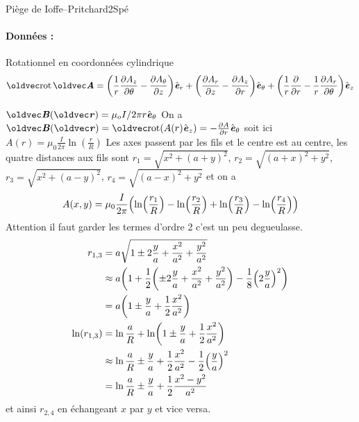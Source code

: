\begin{exercise}{Piège de Ioffe--Pritchard}{2}{Spé}
\paragraph{Données :} 
Rotationnel en coordonnées cylindrique
$$\rot\vA = \qty(\dfrac{1}{r}\pdv{A_z}{\theta} - \pdv{A_\theta}{z}) \ve_r
+ \qty(\pdv{A_r}{z} - \pdv{A_z}{r}) \ve_\theta
+ \qty(\dfrac{1}{r}\pdv{}{r} (r A_\theta) - \dfrac{1}{r}\pdv{A_r}{\theta}) \ve_z$$ 

\end{exercise}

\begin{solution}

\begin{questions}
    \questioncours $\vB(\vr) = \mu_o I/2\pi r \ve_\theta$
    \question On a $\vB(\vr) = \rot(A(r)\ve_z) = -\pdv{A}{r}\ve_\theta$ soit ici $A(r) = \mu_0 \frac{I}{2\pi}\ln(\frac{r}{R})$
    \question Les axes passent par les fils et le centre est au centre, les quatre distances aux fils sont $r_1 = \sqrt{x^2 + (a+y)^2}$, $r_2 = \sqrt{(a+x)^2 + y^2}$, $r_3 = \sqrt{x^2 + (a-y)^2}$, $r_4 = \sqrt{(a-x)^2 + y^2}$ et on a $$ A(x,y) =  \mu_0 \frac{I}{2\pi}\qty( \ln(\frac{r_1}{R}) - \ln(\frac{r_2}{R}) + \ln(\frac{r_3}{R}) - \ln(\frac{r_4}{R}) ) $$
    \question Attention il faut garder les termes d'ordre 2 c'est un peu degueulasse.
    \begin{align*}
        r_{1,3} & = a\sqrt{1 \pm 2\frac{y}{a} + \frac{x^2}{a^2} + \frac{y^2}{a^2}} \\
        &\approx a\qty(1 + \frac12\qty(\pm 2\frac{y}{a} + \frac{x^2}{a^2} + \frac{y^2}{a^2}) - \frac18\qty(2\frac{y}{a})^2) \\
        & = a\qty(1 \pm \frac{y}{a} + \frac12\frac{x^2}{a^2}) \\
        \ln(r_{1,3}) &= \ln\frac{a}{R} + \ln(1 \pm \frac{y}{a} + \frac12\frac{x^2}{a^2}) \\
        &\approx \ln\frac{a}{R} \pm \frac{y}{a} + \frac12\frac{x^2}{a^2} - \frac12\qty(\frac{y}{a})^2 \\
        &= \ln\frac{a}{R} \pm \frac{y}{a} + \frac12\frac{x^2-y^2}{a^2}
    \end{align*}
    et ainsi $r_{2,4}$ en échangeant $x$ par $y$ et vice versa.
    

\end{questions}
\end{solution}
